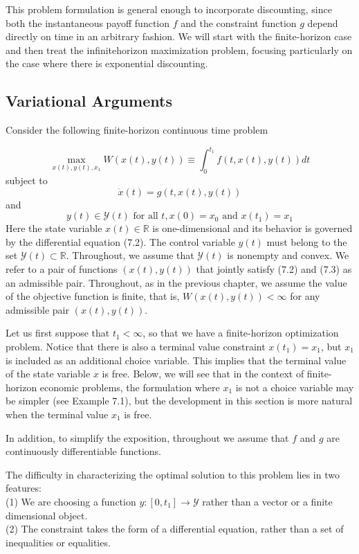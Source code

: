 \documentclass[\topdir/lecture_notes.tex]{subfiles}
\begin{document}
This problem formulation is general enough to incorporate discounting, since both the instantaneous payoff function $f$ and the constraint function $g$ depend directly on time in an arbitrary fashion. We will start with the finite-horizon case and then treat the infinitehorizon maximization problem, focusing particularly on the case where there is exponential discounting.

\subsection{Variational Arguments}
Consider the following finite-horizon continuous time problem

\[
\max _{x(t), y(t), x_{1}} W(x(t), y(t)) \equiv \int_{0}^{t_{1}} f(t, x(t), y(t)) d t
\]
subject to
\[
\dot{x}(t)=g(t, x(t), y(t))
\]
and
\[
y(t) \in \mathcal{Y}(t) \text { for all } t, x(0)=x_{0} \text { and } x\left(t_{1}\right)=x_{1}
\]
Here the state variable $x(t) \in \mathbb{R}$ is one-dimensional and its behavior is governed by the differential equation (7.2). The control variable $y(t)$ must belong to the set $\mathcal{Y}(t) \subset \mathbb{R}$. Throughout, we assume that $\mathcal{Y}(t)$ is nonempty and convex. We refer to a pair of functions $(x(t), y(t))$ that jointly satisfy (7.2) and (7.3) as an admissible pair. Throughout, as in the previous chapter, we assume the value of the objective function is finite, that is, $W(x(t), y(t))<\infty$ for any admissible pair $(x(t), y(t))$.

Let us first suppose that $t_1<\infty$, so that we have a finite-horizon optimization problem. Notice that there is also a terminal value constraint $x\left(t_1\right)=x_1$, but $x_1$ is included as an additional choice variable. This implies that the terminal value of the state variable $x$ is free. Below, we will see that in the context of finite-horizon economic problems, the formulation where $x_1$ is not a choice variable may be simpler (see Example 7.1), but the development in this section is more natural when the terminal value $x_1$ is free.

In addition, to simplify the exposition, throughout we assume that $f$ and $g$ are continuously differentiable functions.

The difficulty in characterizing the optimal solution to this problem lies in two features:\\
(1) We are choosing a function $y:\left[0, t_1\right] \rightarrow \mathcal{Y}$ rather than a vector or a finite dimensional object.\\
(2) The constraint takes the form of a differential equation, rather than a set of inequalities or equalities.
\end{document}
